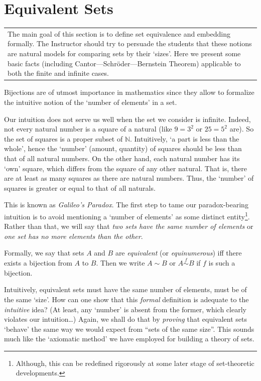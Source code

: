 \documentclass[12pt,notitlepage]{article}
\theoremstyle{plain}
\theoremstyle{definition}
\theoremstyle{plain}
\newcommand{\N}{\mathbb{N}}
\newcommand{\1}{\mathbf{1}}
\newcommand{\0}{\mathbf{0}}
\newcommand{\mcomm}[1]{
\medskip\noindent\begin{tabular}{| l}
\parbox{0.99\textwidth}{{\small
#1 }}\end{tabular}
\smallskip}
\begin{document}
\section{Equivalent Sets}
\mcomm{The main goal of this section is to define set equivalence and embedding formally. The Instructor should try to persuade the students that these notions are natural models for comparing sets by their `sizes'. Here we present some basic facts (including Cantor---Schr\"{o}der---Bernstein Theorem) applicable to both the finite and infinite cases.}

Bijections are of utmost importance in mathematics since they allow to formalize the intuitive notion of the `number of elements' in a set.

Our intuition does not serve us well when the set we consider is infinite. Indeed, not every natural number is a square of a natural (like $9 = 3^2$ or $25 = 5^2$ are). So the set of squares is a proper subset of $\N$. Intuitively, `a part is less than the whole', hence the `number' (amount, quantity) of squares should be less than that of all natural numbers. On the other hand, each natural number has its `own' square, which differs from the square of any other natural. That is, there are at least as many squares as there are natural numbers. Thus, the `number' of squares is greater or equal to that of all naturals.

This is known as \emph{Galileo's Paradox}. The first step to tame our paradox-bearing intuition is to avoid  mentioning a `number of elements' as some distinct entity\footnote{Although, this can be redefined rigorously at some later stage of set-theoretic developments.}. Rather than that, we will say that \emph{two sets have the same number of elements} or \emph{one set has no more elements than the other}.

Formally, we say that sets $A$ and $B$ are \emph{equivalent} (or \emph{equinumerous}) iff there exists a bijection from $A$ to $B$. Then we write $A \sim B$ or $A \stackrel{f}{\sim} B$ if $f$ is such a bijection.

Intuitively, equivalent sets must have the same number of elements, must be of the same `size'. How can one show that this \emph{formal} definition is adequate to the \emph{intuitive} idea? (At least, any `number' is absent from the former, which clearly violates our intuition\dots) Again, we shall do that by \emph{proving} that equivalent sets `behave' the same way we would expect from ``sets of the same size''. This sounds much like the `axiomatic method' we have employed for building a theory of sets.
\end{document}
